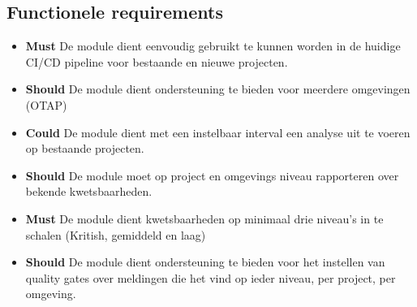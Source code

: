 \subsection{Functionele requirements}\label{subsec:functionele-requirements}
\begin{itemize}
    \item \textbf{Must} De module dient eenvoudig gebruikt te kunnen worden in de huidige CI/CD pipeline voor bestaande en nieuwe projecten.
    \item \textbf{Should} De module dient ondersteuning te bieden voor meerdere omgevingen (OTAP)
    \item \textbf{Could} De module dient met een instelbaar interval een analyse uit te voeren op bestaande projecten.
    \item \textbf{Should} De module moet op project en omgevings niveau rapporteren over bekende kwetsbaarheden.
    \item \textbf{Must} De module dient kwetsbaarheden op minimaal drie niveau's in te schalen (Kritish, gemiddeld en laag)
    \item \textbf{Should} De module dient ondersteuning te bieden voor het instellen van quality gates over meldingen die het vind op ieder niveau, per project, per omgeving.
\end{itemize}

